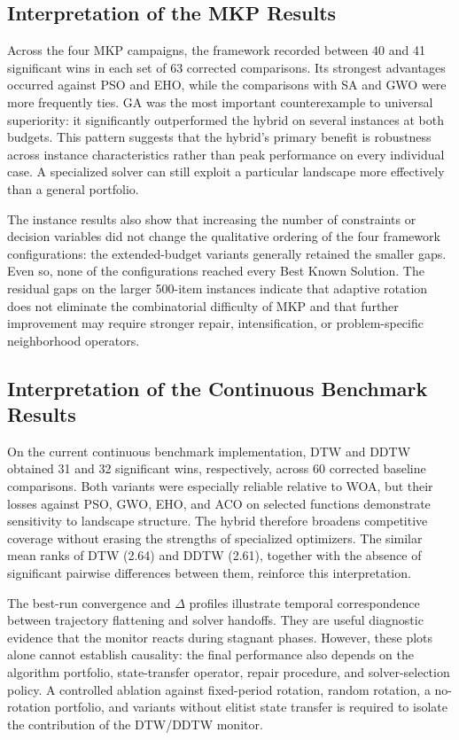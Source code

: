 \subsection{Interpretation of the MKP Results}
\label{sec:discussion_mkp}

Across the four MKP campaigns, the framework recorded between 40 and 41 significant wins in each set of 63 corrected comparisons. Its strongest advantages occurred against PSO and EHO, while the comparisons with SA and GWO were more frequently ties. GA was the most important counterexample to universal superiority: it significantly outperformed the hybrid on several instances at both budgets. This pattern suggests that the hybrid's primary benefit is robustness across instance characteristics rather than peak performance on every individual case. A specialized solver can still exploit a particular landscape more effectively than a general portfolio.

The instance results also show that increasing the number of constraints or decision variables did not change the qualitative ordering of the four framework configurations: the extended-budget variants generally retained the smaller gaps. Even so, none of the configurations reached every Best Known Solution. The residual gaps on the larger 500-item instances indicate that adaptive rotation does not eliminate the combinatorial difficulty of MKP and that further improvement may require stronger repair, intensification, or problem-specific neighborhood operators.

\subsection{Interpretation of the Continuous Benchmark Results}
\label{sec:discussion_continuous}

On the current continuous benchmark implementation, DTW and DDTW obtained 31 and 32 significant wins, respectively, across 60 corrected baseline comparisons. Both variants were especially reliable relative to WOA, but their losses against PSO, GWO, EHO, and ACO on selected functions demonstrate sensitivity to landscape structure. The hybrid therefore broadens competitive coverage without erasing the strengths of specialized optimizers. The similar mean ranks of DTW (2.64) and DDTW (2.61), together with the absence of significant pairwise differences between them, reinforce this interpretation.

The best-run convergence and $\Delta$ profiles illustrate temporal correspondence between trajectory flattening and solver handoffs. They are useful diagnostic evidence that the monitor reacts during stagnant phases. However, these plots alone cannot establish causality: the final performance also depends on the algorithm portfolio, state-transfer operator, repair procedure, and solver-selection policy. A controlled ablation against fixed-period rotation, random rotation, a no-rotation portfolio, and variants without elitist state transfer is required to isolate the contribution of the DTW/DDTW monitor.

